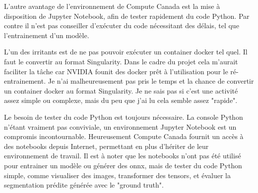 \par L'autre avantage de l'environnement de Compute Canada est la mise à disposition de Jupyter Notebook, afin de tester rapidement du code Python. Par contre il n'est pas conseiller d'exécuter du code nécessitant des délais, tel que l'entrainement d'un modèle. 
\par L'un des irritants est de ne pas pouvoir exécuter un container docker tel quel. Il faut le convertir au format Singularity. Dans le cadre du projet cela m'aurait faciliter la tâche car NVIDIA founit des docker prêt à l'utilisation pour le ré-entrainement. Je n'ai malheureusement pas pris le temps et la chance de convertir un container docker au format Singularity. Je ne sais pas si c'est une activité assez simple ou complexe, mais du peu que j'ai lu cela semble assez "rapide".
\par Le besoin de tester du code Python est toujours nécessaire. La console Python n'étant vraiment pas conviviale, un environnement Jupyter Notebook est un compromis incontournable. Heureusement Compute Canada fournit un accès à des notebooks depuis Internet, permettant en plus d'hériter de leur environnement de travail. Il est à noter que les notebooks n'ont pas été utilisé pour entrainer un modèle ou générer des onnx, mais de tester du code Python simple, comme visualiser des images, transformer des tensors, et évaluer la segmentation prédite générée avec le "ground truth". 
